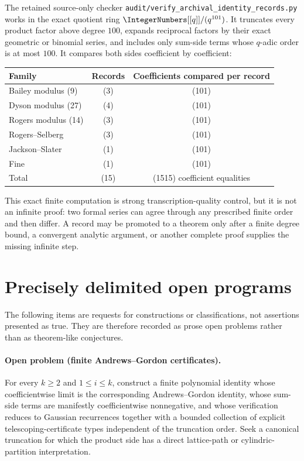 The retained source-only checker
\nolinkurl{audit/verify_archival_identity_records.py} works in the exact
quotient ring \(\IntegerNumbers[[q]]/(q^{101})\).  It truncates every product
factor above degree \(100\), expands reciprocal factors by their exact
geometric or binomial series, and includes only sum-side terms whose
\(q\)-adic order is at most \(100\).  It compares both sides coefficient by
coefficient:
\begin{center}
\begin{tabular}{@{}lcc@{}}
\toprule
Family & Records & Coefficients compared per record\\
\midrule
Bailey modulus (9) & (3) & (101)\\
Dyson modulus (27) & (4) & (101)\\
Rogers modulus (14) & (3) & (101)\\
Rogers--Selberg & (3) & (101)\\
Jackson--Slater & (1) & (101)\\
Fine & (1) & (101)\\
\midrule
Total & (15) & (1515) coefficient equalities\\
\bottomrule
\end{tabular}
\end{center}
This exact finite computation is strong transcription-quality control, but it
is not an infinite proof: two formal series can agree through any prescribed
finite order and then differ.  A record may be promoted to a theorem only
after a finite degree bound, a convergent analytic argument, or another
complete proof supplies the missing infinite step.

\section{Precisely delimited open programs}

The following items are requests for constructions or classifications, not
assertions presented as true.  They are therefore recorded as prose open
problems rather than as theorem-like conjectures.

\paragraph{Open problem (finite Andrews--Gordon certificates).}
\label{qg:prob-finite-andrews-gordon-certificates}
For every \(k\ge2\) and \(1\le i\le k\), construct a finite polynomial
identity whose coefficientwise limit is the corresponding Andrews--Gordon
identity, whose sum-side terms are manifestly coefficientwise nonnegative,
and whose verification reduces to Gaussian recurrences together with a
bounded collection of explicit telescoping-certificate types independent of
the truncation order.  Seek a canonical truncation for which the product side
has a direct lattice-path or cylindric-partition interpretation.


